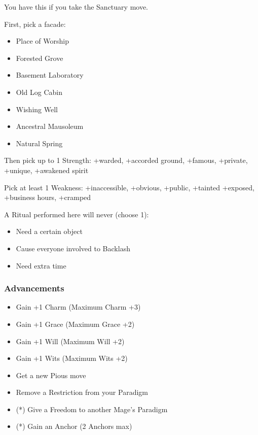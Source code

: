 \documentclass[
]{article}
\providecommand{\tightlist}{%
  \setlength{\itemsep}{0pt}\setlength{\parskip}{0pt}}
\begin{document}
You have this if you take the Sanctuary move.

First, pick a facade:

\begin{itemize}
\tightlist
\item
  Place of Worship
\item
  Forested Grove
\item
  Basement Laboratory
\item
  Old Log Cabin
\item
  Wishing Well
\item
  Ancestral Mausoleum
\item
  Natural Spring
\end{itemize}

Then pick up to 1 Strength: +warded, +accorded ground, +famous,
+private, +unique, +awakened spirit

Pick at least 1 Weakness: +inaccessible, +obvious, +public, +tainted
+exposed, +business hours, +cramped

A Ritual performed here will never (choose 1):

\begin{itemize}
\tightlist
\item
  Need a certain object
\item
  Cause everyone involved to Backlash
\item
  Need extra time
\end{itemize}

\hypertarget{advancements-4}{%
\subsubsection{Advancements}\label{advancements-4}}

\begin{itemize}
\tightlist
\item
  Gain +1 Charm (Maximum Charm +3)
\item
  Gain +1 Grace (Maximum Grace +2)
\item
  Gain +1 Will (Maximum Will +2)
\item
  Gain +1 Wits (Maximum Wits +2)
\item
  Get a new Pious move
\item
  Remove a Restriction from your Paradigm
\item
  (*) Give a Freedom to another Mage's Paradigm
\item
  (*) Gain an Anchor (2 Anchors max)
\end{itemize}
\end{document}
